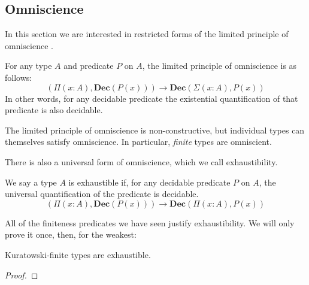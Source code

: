 \subsection{Omniscience}
In this section we are interested in restricted forms of the limited principle
of omniscience \cite{myhillErrettBishopFoundations1972}.
\begin{rm-definition}
  For any type \(A\) and predicate \(P\) on \(A\), the limited principle of
  omniscience is as follows:
  \begin{equation}
    \left( \Pi {(x : A)} , \mathbf{Dec}(P(x)) \right) \rightarrow \mathbf{Dec} \left( \Sigma {(x : A)} , P(x) \right)
  \end{equation}
  In other words, for any decidable predicate the existential quantification of
  that predicate is also decidable.
\end{rm-definition}
The limited principle of omniscience is non-constructive, but individual types
can themselves satisfy omniscience.
In particular, \emph{finite} types are omniscient.

There is also a universal form of omniscience, which we call exhaustibility.
\begin{rm-definition}[Exhaustibility]
  We say a type \(A\) is exhaustible if, for any decidable predicate \(P\) on
  \(A\), the universal quantification of the predicate is decidable.
  \begin{equation}
    \left( \Pi {(x : A)} , \mathbf{Dec}(P(x)) \right) \rightarrow \mathbf{Dec} \left( \Pi {(x : A)} , P(x) \right)
  \end{equation}
\end{rm-definition}

All of the finiteness predicates we have seen justify exhaustibility.
We will only prove it once, then, for the weakest:
\begin{rm-theorem}
  Kuratowski-finite types are exhaustible.
\end{rm-theorem}
\begin{proof}
\end{proof}


